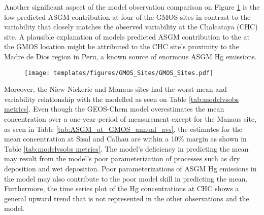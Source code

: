 


\begin{flushleft}
Another significant aspect of the model observation comparison on Figure \ref{fig:GMOSvsGC} is the low predicted ASGM contribution at  four of the GMOS sites in contrast to the variability that closely matches the observed variability at the Chalcataya (CHC) site. A plausible explanation of models predicted ASGM contribution to the \hg at the GMOS location might be attributed to the CHC site's proximity to the Madre de Dios region in Peru, a known source of enormous ASGM Hg emissions. 
\end{flushleft}

\begin{figure}[H]
\texttt{[image: templates/figures/GMOS\_Sites/GMOS\_Sites.pdf]}
\centering
{}
\label{fig:GMOSvsGC}
\end{figure}
\FloatBarrier

\begin{flushleft}
Moreover, the Niew Nickerie and Manaus sites had the worst mean and variability relationship with the modelled \hg as seen on Table \ref{tab:modelvsobs metrics}. Even though the GEOS-Chem model overestimates the mean concentration over a one-year period of measurement except for the Manaus site, as seen in Table \ref{tab:ASGM_at_GMOS_annual_avs}, the estimates for the mean concentration at Sisal and Calhau are within a 10\% margin as shown in Table \ref{tab:modelvsobs metrics}. The model's deficiency in predicting the mean may result from the model's poor parameterization of processes such as dry deposition and wet deposition. Poor parameterizations of ASGM Hg emissions in the model may also  contribute to the poor model skill in predicting the mean. Furthermore, the time series plot of the Hg concentrations at CHC shows a general upward trend that is not represented in the other observations and the model. 
\end{flushleft}


\begin{flushleft}
  
\end{flushleft}

